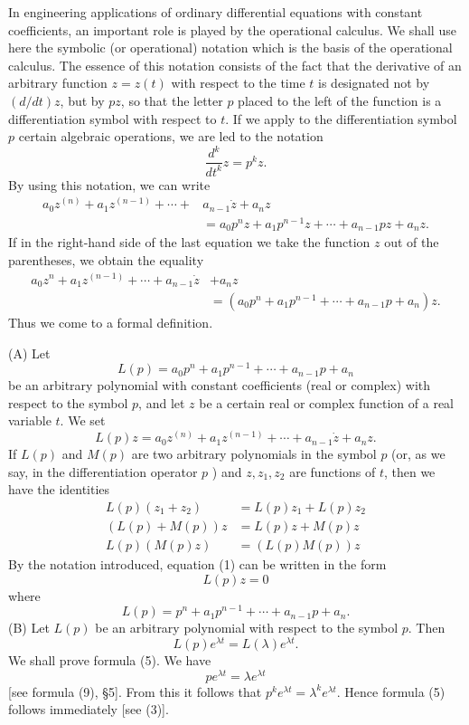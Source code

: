 \documentclass[10pt,a5paper]{book}
\theoremstyle{plain}
\theoremstyle{definition}
\theoremstyle{remark}
\begin{document}
In engineering applications of ordinary differential equations with constant coefficients, an important role is played by the operational calculus. We shall use here the symbolic (or operational) notation which is the basis of the operational calculus. The essence of this notation consists of the fact that the derivative of an arbitrary function $z=z(t)$ with respect to the time $t$ is designated not by $(d / d t) z$, but by $p z$, so that the letter $p$ placed to the left of the function is a differentiation symbol with respect to $t$. If we apply to the differentiation symbol $p$ certain algebraic operations, we are led to the notation
\[
\frac{d^{k}}{d t^{k}} z=p^{k} z .
\]
By using this notation, we can write
\[
\begin{aligned}
a_{0} z^{(n)}+a_{1} z^{(n-1)}+\cdots+ & a_{n-1} \dot{z}+a_{n} z \\
& =a_{0} p^{n} z+a_{1} p^{n-1} z+\cdots+a_{n-1} p z+a_{n} z .
\end{aligned}
\]
If in the right-hand side of the last equation we take the function $z$ out of
the parentheses, we obtain the equality
\[
\begin{aligned}
a_{0} z^{n}+a_{1} z^{(n-1)}+\cdots+a_{n-1} \dot{z} & +a_{n} z \\
& =\left(a_{0} p^{n}+a_{1} p^{n-1}+\cdots+a_{n-1} p+a_{n}\right) z .
\end{aligned}
\]
Thus we come to a formal definition.

(A) Let
\[
L(p)=a_{0} p^{n}+a_{1} p^{n-1}+\cdots+a_{n-1} p+a_{n}
\]
be an arbitrary polynomial with constant coefficients (real or complex) with respect to the symbol $p$, and let $z$ be a certain real or complex function of a real variable $t$. We set
\begin{equation*}
L(p) z=a_{0} z^{(n)}+a_{1} z^{(n-1)}+\cdots+a_{n-1} \dot{z}+a_{n} z . \tag{3}
\end{equation*}
If $L(p)$ and $M(p)$ are two arbitrary polynomials in the symbol $p$ (or, as we say, in the differentiation operator $p$ ) and $z, z_{1}, z_{2}$ are functions of $t$, then we have the identities
\[
\begin{aligned}
L(p)\left(z_{1}+z_{2}\right) & =L(p) z_{1}+L(p) z_{2} \\
(L(p)+M(p)) z & =L(p) z+M(p) z \\
L(p)(M(p) z) & =(L(p) M(p)) z
\end{aligned}
\]
By the notation introduced, equation (1) can be written in the form
\begin{equation*}
L(p) z=0 \tag{4}
\end{equation*}
where
\[
L(p)=p^{n}+a_{1} p^{n-1}+\cdots+a_{n-1} p+a_{n} .
\]
(B) Let $L(p)$ be an arbitrary polynomial with respect to the symbol $p$. Then
\begin{equation*}
L(p) e^{\lambda t}=L(\lambda) e^{\lambda t} . \tag{5}
\end{equation*}
We shall prove formula (5). We have
\[
p e^{\lambda t}=\lambda e^{\lambda t}
\]
[see formula (9), §5]. From this it follows that $p^{k} e^{\lambda t}=\lambda^{k} e^{\lambda t}$. Hence formula (5) follows immediately [see (3)].
\end{document}
